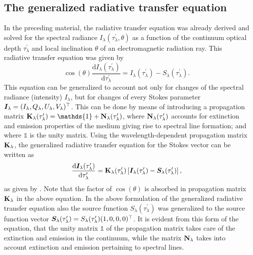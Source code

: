 \documentclass[a4paper,12pt]{report}
\begin{document}
\subsection{The generalized radiative transfer equation}
In the preceding material, the radiative transfer equation was already derived and solved for the spectral radiance $I_\lambda(\tau_\lambda^\prime, \theta)$ as a function of the continuum optical depth $\tau_\lambda^\prime$ and local inclination $\theta$ of an electromagnetic radiation ray. This radiative transfer equation was given by \begin{equation}
\cos(\theta)\frac{\mathrm{d}I_\lambda(\tau_\lambda^\prime)}{\mathrm{d}\tau_\lambda^\prime} = I_\lambda(\tau_\lambda^\prime)-S_\lambda(\tau_\lambda^\prime).
\end{equation} This equation can be generalized to account not only for changes of the spectral radiance (intensity) $I_\lambda$, but for changes of every Stokes parameter $\bm{I}_\lambda = (I_\lambda, Q_\lambda, U_\lambda, V_\lambda)^\top$. This can be done by means of introducing a propagation matrix $\matr{K}_\lambda(\tau_\lambda^\prime) = \mathds{1} + \matr{N}_\lambda(\tau_\lambda^\prime)$, where $\boldsymbol{\mathbf{N}}_\lambda(\tau_\lambda^\prime)$ accounts for extinction and emission properties of the medium giving rise to spectral line formation; and where $\mathds{1}$ is the unity matrix. Using the wavelength-dependent propagation matrix $\boldsymbol{\mathbf{K}}_\lambda$, the generalized radiative transfer equation for the Stokes vector can be written as \begin{equation}\label{eq:generalizedradtransfereq}
\frac{\mathrm{d}\bm{I}_\lambda(\tau_\lambda^\prime)}{\mathrm{d}\tau_\lambda^\prime} = \boldsymbol{\mathbf{K}}_\lambda(\tau_\lambda^\prime)\left[\bm{I}_\lambda(\tau_\lambda^\prime)-\bm{S}_\lambda(\tau_\lambda^\prime)\right],
\end{equation} as given by \cite[p.150]{delToroIniesta.2003}. Note that the factor of $\cos(\theta)$ is absorbed in propagation matrix $\boldsymbol{\mathbf{K}}_\lambda$ in the above equation. In the above formulation of the generalized radiative transfer equation also the source function $S_\lambda(\tau_\lambda^\prime)$ was generalized to the source function vector $\bm{S}_\lambda(\tau_\lambda^\prime) = S_\lambda(\tau_\lambda^\prime)(1,0,0,0)^\top$. It is evident from this form of the equation, that the unity matrix $\mathds{1}$ of the propagation matrix takes care of the extinction and emission in the continuum, while the matrix $\boldsymbol{\mathbf{N}}_\lambda$ takes into account extinction and emission pertaining to spectral lines. 
\end{document}
